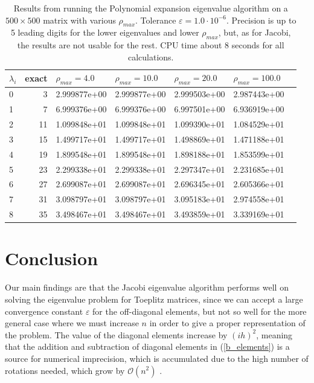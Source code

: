 \documentclass[]{article}
\begin{document}
\begin{table}[!ht]
	\caption{Results from running the Polynomial expansion eigenvalue algorithm on a $500 \times 500$ matrix with various $\rho_{max}$. Tolerance $\varepsilon = 1.0 \cdot 10^{-6}$. Precision is up to 5 leading digits for the lower eigenvalues and lower $\rho_{max}$, but, as for Jacobi, the results are not usable for the rest. CPU time about 8 seconds for all calculations.}
	\label{tab:poly_general}
	\begin{center}
		\begin{tabular}{lrlllll}
			\toprule
	$\lambda_i$ &    exact & $\rho_{max} = 4.0$ &  $\rho_{max} = 10.0$ & $\rho_{max} = 20.0$ & $\rho_{max} = 100.0$\\
			\midrule
0   & 3 & 2.999877e+00 & 2.999877e+00 & 2.999503e+00 & 2.987443e+00 \\
1   & 7 & 6.999376e+00 & 6.999376e+00 & 6.997501e+00 & 6.936919e+00 \\
2   & 11 & 1.099848e+01 & 1.099848e+01 & 1.099390e+01 & 1.084529e+01 \\
3   & 15 & 1.499717e+01 & 1.499717e+01 & 1.498869e+01 & 1.471188e+01 \\
4   & 19 & 1.899548e+01 & 1.899548e+01 & 1.898188e+01 & 1.853599e+01 \\
5   & 23 & 2.299338e+01 & 2.299338e+01 & 2.297347e+01 & 2.231685e+01 \\
6   & 27 & 2.699087e+01 & 2.699087e+01 & 2.696345e+01 & 2.605366e+01 \\
7   & 31 & 3.098797e+01 & 3.098797e+01 & 3.095183e+01 & 2.974558e+01 \\
8   & 35 & 3.498467e+01 & 3.498467e+01 & 3.493859e+01 & 3.339169e+01 \\
			\bottomrule
		\end{tabular}
	\end{center}
\end{table}


\section{Conclusion}
Our main findings are that the Jacobi eigenvalue algorithm performs well on solving the eigenvalue problem for Toeplitz matrices, since we can accept a large convergence constant $\varepsilon$ for the off-diagonal elements, but not so well for the more general case where we must increase $n$ in order to give a proper representation of the problem. The value of the diagonal elements increase by $(ih)^2$, meaning that the addition and subtraction of diagonal elements in (\ref{b_elements}) is a source for numerical imprecision, which is accumulated due to the high number of rotations needed, which grow by $\mathcal{O}(n^2)$ \cite{fys4150-notes}.
\end{document}
